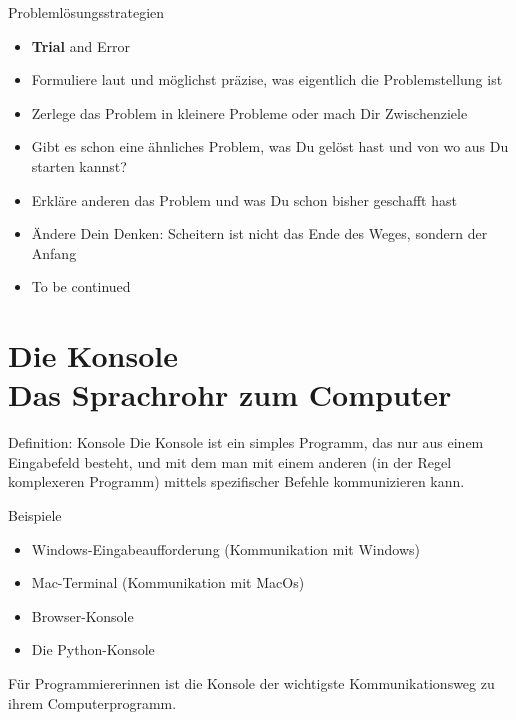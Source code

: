 \begin{frame}
\begin{block}{Problemlösungsstrategien}
	\pause 
	\begin{itemize}[<+->]
		\item \textbf{Trial} and Error
		\item Formuliere laut und möglichst präzise, was eigentlich die Problemstellung ist
		\item Zerlege das Problem in kleinere Probleme oder mach Dir Zwischenziele
		\item Gibt es schon eine ähnliches Problem, was Du gelöst hast und von wo aus Du starten kannst?
		\item Erkläre anderen das Problem und was Du schon bisher geschafft hast
		\item Ändere Dein Denken: Scheitern ist nicht das Ende des Weges, sondern der Anfang
		\item To be continued
	\end{itemize}
\end{block}
\end{frame}



\section{Die Konsole \\ \footnotesize{Das Sprachrohr zum Computer}}


\begin{frame}

\begin{block}{Definition: Konsole}
	\vspace{2pt}
	Die Konsole ist ein simples Programm, das nur aus einem Eingabefeld besteht, und mit dem man mit einem anderen (in der Regel komplexeren Programm) mittels spezifischer Befehle kommunizieren kann. 
\end{block}

\vspace{10pt}

\pause 


\begin{exampleblock}{Beispiele}
	\begin{itemize}
		\item Windows-Eingabeaufforderung (Kommunikation mit Windows)
		\item Mac-Terminal (Kommunikation mit MacOs)
		\item Browser-Konsole
		\item Die Python-Konsole
	\end{itemize}
\end{exampleblock}

\pause 

	Für Programmiererinnen ist die Konsole der wichtigste Kommunikationsweg zu ihrem Computerprogramm. 
\end{frame}


